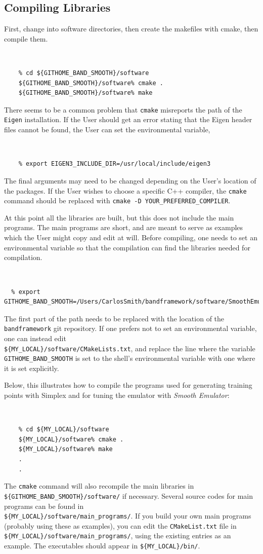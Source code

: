 \documentclass[UserManual.tex]{subfiles}
\begin{document}
\subsection{Compiling Libraries }

First, change into software directories, then create the makefiles with cmake, then compile them.
{\tt 
\begin{verbatim}
    % cd ${GITHOME_BAND_SMOOTH}/software
    ${GITHOME_BAND_SMOOTH}/software% cmake .
    ${GITHOME_BAND_SMOOTH}/software% make
\end{verbatim}
}
There seems to be a common problem that {\tt cmake} misreports the path of the {\tt Eigen} installation. If the User should get an error stating that the Eigen header files cannot be found, the User can set the environmental variable,
{\tt 
\begin{verbatim}
    % export EIGEN3_INCLUDE_DIR=/usr/local/include/eigen3
\end{verbatim}
}
The final arguments may need to be changed depending on the User's location of the packages. If the User wishes to choose a specific C++ compiler, the {\tt cmake} command should be replaced with {\tt cmake -D YOUR\_PREFERRED\_COMPILER}. 

At this point all the libraries are built, but this does not include the main programs. The main programs are short, and are meant to serve as examples which the User might copy and edit at will. Before compiling, one needs to set an environmental variable so that the compilation can find the libraries needed for compilation.
{\tt
\begin{verbatim}
  % export GITHOME_BAND_SMOOTH=/Users/CarlosSmith/bandframework/software/SmoothEmulator
\end{verbatim}
}
The first part of the path needs to be replaced with the location of the {\tt bandframework} git repository. If one prefers not to set an environmental variable, one can instead edit\\
{\tt \$\{MY\_LOCAL\}/software/CMakeLists.txt}, and replace the line where the variable {\tt GITHOME\_BAND\_SMOOTH} is set to the shell's environmental variable with one where it is set explicitly.

Below, this illustrates how to compile the programs used for generating training points with Simplex and for tuning the emulator with {\it Smooth Emulator}:
{\tt
\begin{verbatim}
    % cd ${MY_LOCAL}/software
    ${MY_LOCAL}/software% cmake .
    ${MY_LOCAL}/software% make
    .
    .
\end{verbatim}
}
The {\tt cmake} command will also recompile the main libraries in {\tt \$\{GITHOME\_BAND\_SMOOTH\}/software/} if necessary. Several source codes for main programs can be found in\\
{\tt \$\{MY\_LOCAL\}/software/main\_programs/}. If you build your own main programs (probably using these as examples), you can edit the {\tt CMakeList.txt} file in {\tt \$\{MY\_LOCAL\}/software/main\_programs/}, using the existing entries as an example. The executables should appear in {\tt \$\{MY\_LOCAL\}/bin/}. 
\end{document}
